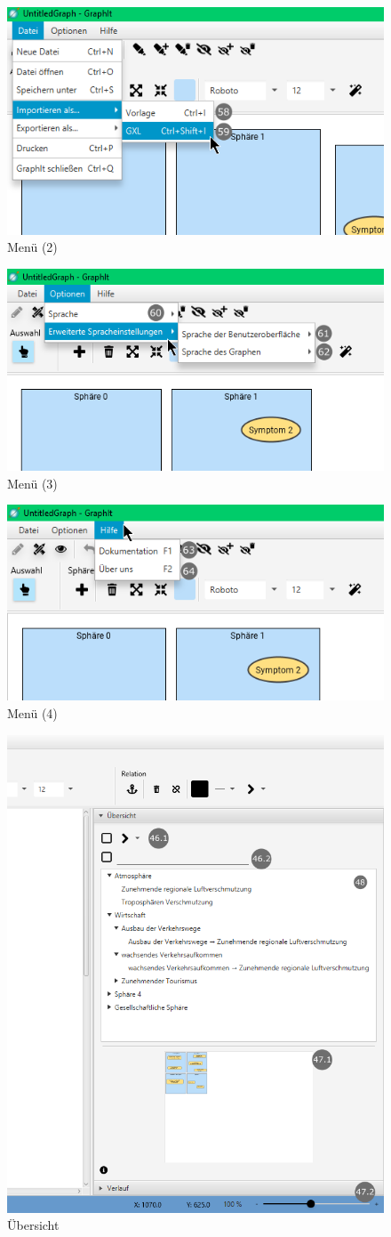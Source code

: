 \documentclass[enabledeprecatedfontcommands,fontsize=11pt,paper=a4,twoside]{scrartcl}
\begin{document}
\begin{figure}[ht!]
	\centering
	\includegraphics[width=0.5\columnwidth, keepaspectratio]{menu4.png} 
	\caption{Menü (2)}
\end{figure}

\begin{figure}[ht!]
	\centering
	\includegraphics[width=0.5\columnwidth, keepaspectratio]{menu2.png} 
	\caption{Menü (3)}
\end{figure}

\begin{figure}[ht!]
	\centering
	\includegraphics[width=0.5\columnwidth, keepaspectratio]{menu3.png} 
	\caption{Menü (4)}
\end{figure}


\begin{figure}[ht!]
	\centering
	\includegraphics[width=0.5\columnwidth, keepaspectratio]{side.png} 
	\caption{Übersicht}
\end{figure}
\end{document}

